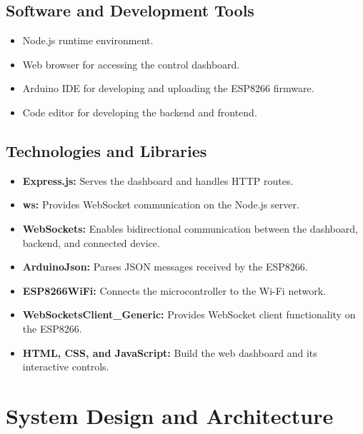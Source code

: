 \documentclass[12pt,a4paper]{article}
\begin{document}
\vspace{0.5cm}

\subsection*{Software and Development Tools}
\begin{itemize}
    \item Node.js runtime environment.
    \item Web browser for accessing the control dashboard.
    \item Arduino IDE for developing and uploading the ESP8266 firmware.
    \item Code editor for developing the backend and frontend.
\end{itemize}

\vspace{0.5cm}

\subsection*{Technologies and Libraries}
\begin{itemize}
    \item \textbf{Express.js:} Serves the dashboard and handles HTTP routes.
    \item \textbf{ws:} Provides WebSocket communication on the Node.js server.
    \item \textbf{WebSockets:} Enables bidirectional communication between the dashboard, backend, and connected device.
    \item \textbf{ArduinoJson:} Parses JSON messages received by the ESP8266.
    \item \textbf{ESP8266WiFi:} Connects the microcontroller to the Wi-Fi network.
    \item \textbf{WebSocketsClient\_Generic:} Provides WebSocket client functionality on the ESP8266.
    \item \textbf{HTML, CSS, and JavaScript:} Build the web dashboard and its interactive controls.
\end{itemize}



\newpage
\section*{System Design and Architecture}
\end{document}
